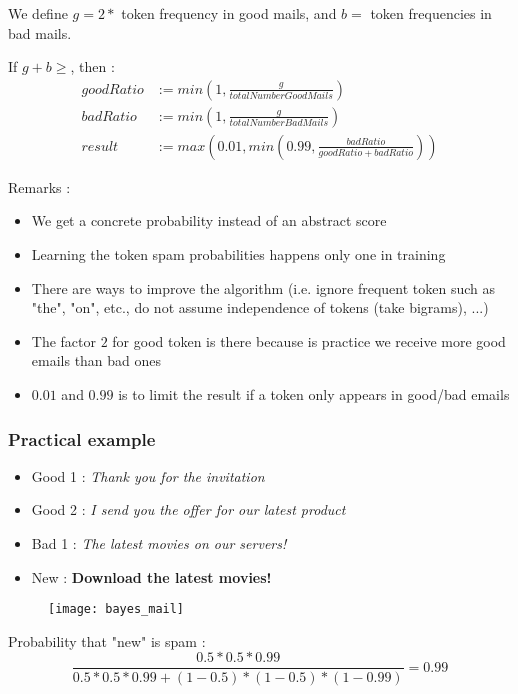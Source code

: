 We define $g = 2 * $ token frequency in good mails, and $b = $ token frequencies in bad mails. 

If $g + b \geq $, then :
\begin{align*}
goodRatio &:= min(1, \frac{g}{totalNumberGoodMails})\\
badRatio &:= min(1, \frac{g}{totalNumberBadMails})\\
result &:= max(0.01, min (0.99, \frac{badRatio}{goodRatio + badRatio}))
\end{align*}

Remarks :
\begin{itemize}
    \item We get a concrete probability instead of an abstract score
    \item Learning the token spam probabilities happens only one in training
    \item There are ways to improve the algorithm (i.e. ignore frequent token such as "the", "on", etc., do not assume independence of tokens (take bigrams), ...)
    \item The factor $2$ for good token is there because is practice we receive more good emails than bad ones
    \item $0.01$ and $0.99$ is to limit the result if a token only appears in good/bad emails
\end{itemize}

\subsubsection{Practical example}

\begin{itemize}
    \item Good 1 : \textit{Thank you for the invitation}
    \item Good 2 : \textit{I send you the offer for our latest product}
    \item Bad 1 : \textit{The latest movies on our servers!}
    \item New : \textbf{Download the latest movies!}
\end{itemize}

\begin{figure}[H]
    \centering
    \texttt{[image: bayes\_mail]}
\end{figure}

Probability that "new" is spam :
\begin{equation*}
\frac{0.5 * 0.5 * 0.99}{0.5 * 0.5 * 0.99 + (1-0.5) * (1-0.5) * (1-0.99)} = 0.99
\end{equation*}

